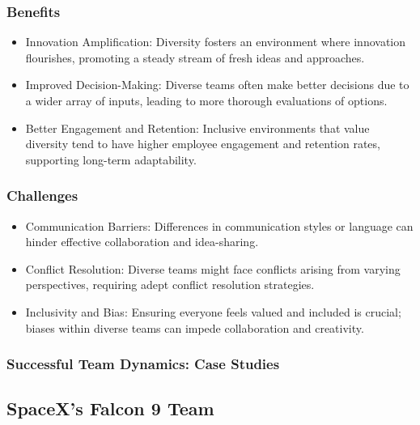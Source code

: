 \documentclass[a4paper, twoside]{article}
\begin{document}
\subsubsection{Benefits}

\begin{itemize}
    \item{Innovation Amplification:} Diversity fosters an environment where innovation flourishes, promoting a steady stream of fresh ideas and approaches.
    
    \item{Improved Decision-Making:} Diverse teams often make better decisions due to a wider array of inputs, leading to more thorough evaluations of options.
    
    \item{Better Engagement and Retention:} Inclusive environments that value diversity tend to have higher employee engagement and retention rates, supporting long-term adaptability.
\end{itemize}

\subsubsection{Challenges}

\begin{itemize}
    \item{Communication Barriers:} Differences in communication styles or language can hinder effective collaboration and idea-sharing.
    
    \item{Conflict Resolution:} Diverse teams might face conflicts arising from varying perspectives, requiring adept conflict resolution strategies.
    
    \item{Inclusivity and Bias:} Ensuring everyone feels valued and included is crucial; biases within diverse teams can impede collaboration and creativity.
\end{itemize}



\subsubsection{Successful Team Dynamics: Case Studies}

\subsection*{SpaceX's Falcon 9 Team}
\end{document}
